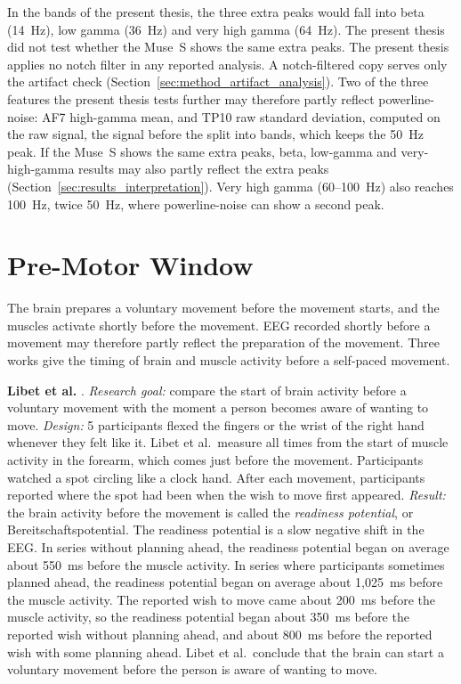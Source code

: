 \documentclass[12pt,a4paper]{report}
\begin{document}
In the bands of the present thesis, the three extra peaks would fall into beta (14~Hz), low gamma (36~Hz) and very high gamma (64~Hz). The present thesis did not test whether the Muse~S shows the same extra peaks. The present thesis applies no notch filter in any reported analysis. A notch-filtered copy serves only the artifact check (Section~\ref{sec:method_artifact_analysis}). Two of the three features the present thesis tests further may therefore partly reflect powerline-noise: AF7 high-gamma mean, and TP10 raw standard deviation, computed on the raw signal, the signal before the split into bands, which keeps the 50~Hz peak. If the Muse~S shows the same extra peaks, beta, low-gamma and very-high-gamma results may also partly reflect the extra peaks (Section~\ref{sec:results_interpretation}). Very high gamma (60--100~Hz) also reaches 100~Hz, twice 50~Hz, where powerline-noise can show a second peak.

\section{Pre-Motor Window}
\label{sec:lit_premotor}
The brain prepares a voluntary movement before the movement starts, and the muscles activate shortly before the movement. EEG recorded shortly before a movement may therefore partly reflect the preparation of the movement. Three works give the timing of brain and muscle activity before a self-paced movement.

\textbf{Libet et al.} \cite{libet_time_1983}. \emph{Research goal:} compare the start of brain activity before a voluntary movement with the moment a person becomes aware of wanting to move. \emph{Design:} 5 participants flexed the fingers or the wrist of the right hand whenever they felt like it. Libet et al.\ measure all times from the start of muscle activity in the forearm, which comes just before the movement. Participants watched a spot circling like a clock hand. After each movement, participants reported where the spot had been when the wish to move first appeared. \emph{Result:} the brain activity before the movement is called the \emph{readiness potential}, or Bereitschaftspotential. The readiness potential is a slow negative shift in the EEG. In series without planning ahead, the readiness potential began on average about 550~ms before the muscle activity. In series where participants sometimes planned ahead, the readiness potential began on average about 1{,}025~ms before the muscle activity. The reported wish to move came about 200~ms before the muscle activity, so the readiness potential began about 350~ms before the reported wish without planning ahead, and about 800~ms before the reported wish with some planning ahead. Libet et al.\ conclude that the brain can start a voluntary movement before the person is aware of wanting to move.
\end{document}
